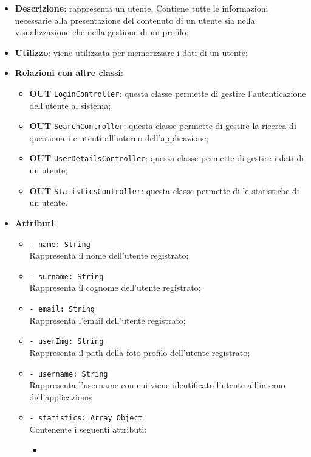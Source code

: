 		\begin{itemize}
			\item \textbf{Descrizione}: rappresenta un utente. Contiene tutte le informazioni necessarie alla presentazione del contenuto di un utente sia nella visualizzazione che nella gestione di un profilo;
			\item \textbf{Utilizzo}: viene utilizzata per memorizzare i dati di un utente;
			\item \textbf{Relazioni con altre classi}: 
			\begin{itemize}
				\item \textbf{OUT} \texttt{LoginController}: questa classe permette di gestire l'autenticazione dell'utente al sistema;
				\item \textbf{OUT} \texttt{SearchController}: questa classe permette di gestire la ricerca di questionari e utenti all'interno dell'applicazione;
				\item \textbf{OUT} \texttt{UserDetailsController}: questa classe permette di gestire i dati di un utente;
				\item \textbf{OUT} \texttt{StatisticsController}: questa classe permette di le statistiche di un utente.
			\end{itemize}
			\item \textbf{Attributi}: 
			\begin{itemize}
				\item 
				\texttt{- name: String}\\
				Rappresenta il nome  dell'utente registrato;
				\item 
				\texttt{- surname: String}\\
				Rappresenta il cognome  dell'utente registrato;
				\item 
				\texttt{- email: String}\\
				Rappresenta l'email  dell'utente registrato;
				\item 
				\texttt{- userImg: String}\\
				Rappresenta il path della foto profilo dell'utente registrato;
				\item 
				\texttt{- username: String}\\ 
				Rappresenta l'username con cui viene identificato l'utente all'interno dell'applicazione;		  		
				\item
				\texttt{- statistics: Array Object}\\
				Contenente i seguenti attributi:
				\begin{itemize}
					\item

\end{itemize}
\end{itemize}
\end{itemize}
